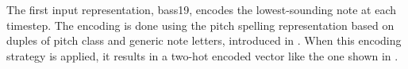 
The first input representation, \gls{bass19}, encodes the
lowest-sounding note at each timestep. The encoding is done
using the pitch spelling representation based on duples of
pitch class and generic note letters, introduced in
. When this encoding
strategy is applied, it results in a two-hot encoded vector
like the one shown in .

